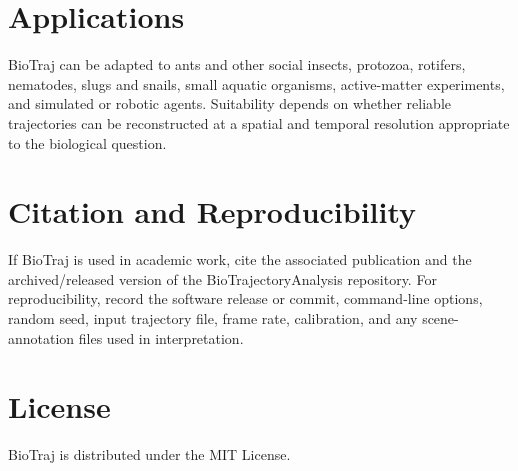 \documentclass[11pt,a4paper]{article}
\begin{document}
\section{Applications}
BioTraj can be adapted to ants and other social insects, protozoa, rotifers, nematodes, slugs and snails, small aquatic organisms, active-matter experiments, and simulated or robotic agents. Suitability depends on whether reliable trajectories can be reconstructed at a spatial and temporal resolution appropriate to the biological question.

\section{Citation and Reproducibility}
If BioTraj is used in academic work, cite the associated publication and the archived/released version of the BioTrajectoryAnalysis repository. For reproducibility, record the software release or commit, command-line options, random seed, input trajectory file, frame rate, calibration, and any scene-annotation files used in interpretation.

\section{License}
BioTraj is distributed under the MIT License.
\end{document}
